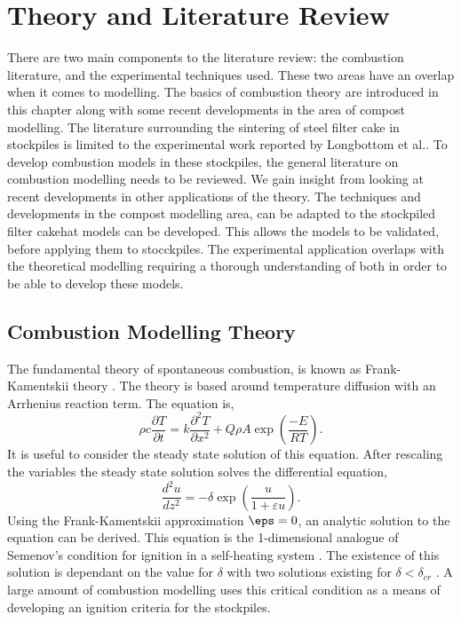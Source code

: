 \chapter{Theory and Literature Review}
There are two main components to the literature review: the combustion literature, and the experimental techniques used. These two areas have an overlap when it comes to modelling. The basics of combustion theory are introduced in this chapter along with some recent developments in the area of compost modelling. The literature surrounding the sintering of steel filter cake in stockpiles is limited to the experimental work reported by Longbottom et al.\cite{Ray19}. To develop combustion models in these stockpiles, the general literature on combustion modelling needs to be reviewed. We gain insight from looking at recent developments in other applications of the theory. The techniques and developments in the compost modelling area, can be adapted to the stockpiled filter cakehat models can be developed. This allows the models to be validated, before applying them to stocckpiles. The experimental application overlaps with the theoretical modelling requiring a thorough understanding of both in order to be able to develop these models.  
\section{Combustion Modelling Theory}
The fundamental theory of spontaneous combustion, is known as Frank-Kamentskii theory \cite{bowes}. The theory is based around temperature diffusion with an Arrhenius reaction term. The equation is,
\begin{equation}
\rho c\frac{\partial T}{\partial t}=k\frac{\partial^2 T}{\partial x^2}+Q\rho A\exp\left(\frac{-E}{RT}\right). \label{Comb_model}
\end{equation}
It is useful to consider the steady state solution of this equation.  
After rescaling the variables the steady state solution solves the differential equation,
\begin{equation}
\frac{d^2u}{dz^2}=-\delta\exp\left(\frac{u}{1+\varepsilon u}\right). \label{FK_mod}
\end{equation}
Using the Frank-Kamentskii approximation $\eps=0$, an analytic solution to the equation can be derived. This equation is the 1-dimensional analogue of Semenov's condition for ignition in a self-heating system \cite{bowes}.  The existence of this solution is dependant on the value for $\delta$ with two solutions existing for $\delta<\delta_{cr}$ \cite{bowes}. A large amount of combustion modelling uses this critical condition as a means of developing an ignition criteria for the stockpiles.
